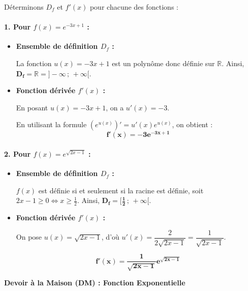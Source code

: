 \documentclass[12pt,a4paper]{article}
\begin{document}
\begin{tcolorbox}[colback=gray!5!white,colframe=myblue,title=\textbf{Correction de l'Exemple 3}]

Déterminons $D_f$ et $f'(x)$ pour chacune des fonctions :

\paragraph{1. Pour $f(x) = e^{-3x + 1}$ :}
\begin{itemize}
    \item \textbf{Ensemble de définition $D_f$ :}
    
    La fonction $u(x) = -3x + 1$ est un polynôme donc définie sur $\mathbb{R}$.
    Ainsi, $\mathbf{D_f = \mathbb{R} = ]-\infty \,;\, +\infty[}$.

    \item \textbf{Fonction dérivée $f'(x)$ :}
    
    En posant $u(x) = -3x + 1$, on a $u'(x) = -3$.
    
    En utilisant la formule $(e^{u(x)})' = u'(x)e^{u(x)}$, on obtient :
    $$\mathbf{f'(x) = -3e^{-3x + 1}}$$
\end{itemize}

\vspace{0.4cm}

\paragraph{2. Pour $f(x) = e^{\sqrt{2x - 1}}$ :}
\begin{itemize}
    \item \textbf{Ensemble de définition $D_f$ :}
    
    $f(x)$ est définie si et seulement si la racine est définie, soit $2x - 1 \ge 0 \iff x \ge \frac{1}{2}$.
    Ainsi, $\mathbf{D_f = \Big[\frac{1}{2} \,;\, +\infty\Big[}$.

    \item \textbf{Fonction dérivée $f'(x)$ :}
    
    On pose $u(x) = \sqrt{2x - 1}$, d'où $u'(x) = \dfrac{2}{2\sqrt{2x - 1}} = \dfrac{1}{\sqrt{2x - 1}}$.
    
    $$\mathbf{f'(x) = \frac{1}{\sqrt{2x - 1}} e^{\sqrt{2x - 1}}}$$
\end{itemize}

\end{tcolorbox}

\begin{center}
    \Large\bfseries Devoir à la Maison (DM) : Fonction Exponentielle
\end{center}
\end{document}

